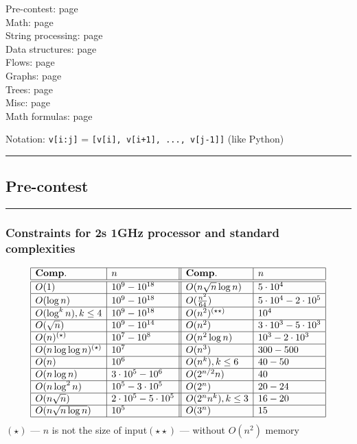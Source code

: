 \documentclass[landscape,a4paper,twocolumn,10pt]{report}
\renewcommand{\line}{\noindent\rule{\linewidth}{1pt}}
\newcommand{\algosection}[1]{\line \subsection*{#1}}
\newcommand{\algorithm}[1]{\line \subsubsection*{#1}}
\begin{document}
\footnotesize

\noindent
Pre-contest: page \pageref{precontest} \\
Math: page \pageref{math} \\
String processing: page \pageref{string} \\
Data structures: page \pageref{datastruct} \\
Flows: page \pageref{flows} \\
Graphs: page \pageref{graphs} \\
Trees: page \pageref{trees} \\
Misc: page \pageref{misc} \\
Math formulas: page \pageref{mathformulas}

\noindent
Notation: \verb#v[i:j]# = \verb#[v[i], v[i+1], ..., v[j-1]]# (like Python)

\algosection{Pre-contest}
\label{precontest}

%

\algorithm{Constraints for 2s 1GHz processor and standard complexities}
$$
\begin{array}{|l|l||l|l|}
\hline
\mathbf{Comp.} & n & \mathbf{Comp.} & n \\
\hline
\hline
O(1) & 10^9 - 10^{18} & O(n \sqrt{n} \log n) & 5 \cdot 10^4 \\
\hline
O(\log n) & 10^9 - 10^{18} & O(\frac{n^2}{64}) & 5 \cdot 10^4 - 2 \cdot 10^5 \\
\hline
O(\log^{k} n), k \le 4 & 10^9 - 10^{18} & O(n^2)^{(\star \star)} & 10^4 \\
\hline
O(\sqrt{n}) & 10^9 - 10^{14} & O(n^2) & 3 \cdot 10^3 - 5 \cdot 10^3 \\
\hline
O(n)^{(\star)} & 10^7 - 10^8 & O(n^2 \log n) & 10^3 - 2 \cdot 10^3 \\
\hline
O(n \log \log n)^{(\star)} & 10^7 & O(n^3) & 300 - 500 \\
\hline
O(n) & 10^6 & O(n^k), k \le 6 & 40 - 50 \\
\hline
O(n \log n) & 3 \cdot 10^5 - 10^6 & O(2^{n/2} n) & 40 \\
\hline
O(n \log^{2} n) & 10^5 - 3 \cdot 10^5 & O(2^{n}) & 20 - 24 \\
\hline
O(n \sqrt{n}) & 2 \cdot 10^5 - 5 \cdot 10^5 & O(2^{n} n^k), k \le 3 & 16 - 20 \\
\hline
O(n \sqrt{n \log n}) & 10^5 & O(3^n) & 15 \\
\hline
\end{array}
$$
$(\star)$ — $n$ is not the size of input\quad $(\star \star)$ — without $O(n^2)$ memory
\end{document}
